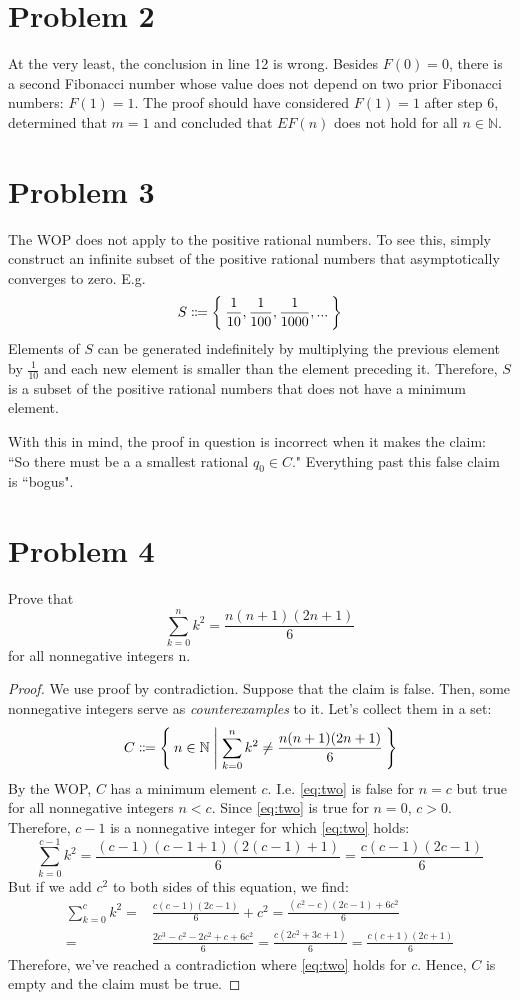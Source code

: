 \documentclass{article}
\begin{document}
\pagebreak

\section{Problem 2} At the very least, the conclusion in line 12 is wrong. Besides $F(0) = 0$, there is a second Fibonacci number whose value does not depend on two prior Fibonacci numbers: $F(1) = 1$. The proof should have considered $F(1) = 1$ after step 6, determined that $m = 1$ and concluded that $EF(n)$ does not hold for all $n \in \mathbb{N}$.

\pagebreak

\section{Problem 3}
The WOP does not apply to the positive rational numbers. To see this, simply construct an infinite subset of the positive rational numbers that asymptotically converges to zero. E.g.
\[
	S \Coloneqq \Set{\frac{1}{10}, \frac{1}{100}, \frac{1}{1000}, ... }
\]
Elements of $S$ can be generated indefinitely by multiplying the previous element by $\frac{1}{10}$ and each new element is smaller than the element preceding it. Therefore, $S$ is a subset of the positive rational numbers that does not have a minimum element.

With this in mind, the proof in question is incorrect when it makes the claim: ``So there must be a a smallest rational $q_0 \in C$." Everything past this false claim is ``bogus".
\pagebreak

\section{Problem 4}
Prove that
\begin{equation}\label{eq:two}
	\sum_{k=0}^n k^2 = \frac{n(n+1)(2n+1)}{6}
\end{equation}
for all nonnegative integers n.
\begin{proof}
	We use proof by contradiction. Suppose that the claim is false. Then, some nonnegative integers serve as \textit{counterexamples} to it. Let's collect them in a set:
	\[
		C \Coloneqq \Set{n \in \mathbb{N} | \sum_{k=0}^n k^2 \neq \frac{n(n+1)(2n+1)}{6}}
	\]
	By the WOP, $C$ has a minimum element $c$. I.e. \eqref{eq:two} is false for $n = c$ but true for all nonnegative integers $n < c$. Since \eqref{eq:two} is true for $n = 0$, $c > 0$.  Therefore, $c - 1$ is a nonnegative integer for which \eqref{eq:two} holds:
	\[
		\sum_{k=0}^{c-1} k^2 = \frac{(c-1)(c-1+1)(2(c-1)+1)}{6} = \frac{c(c-1)(2c-1)}{6}
	\]
	But if we add $c^2$ to both sides of this equation, we find:
	\begin{align*}
		\sum_{k=0}^c k^2 = & \frac{c(c-1)(2c-1)}{6} + c^2 = \frac{(c^2-c)(2c-1)+6c^2}{6} \\ =& \frac{2c^3 - c^2 - 2c^2 + c + 6c^2}{6} = \frac{c(2c^2+3c+1)}{6} = \frac{c(c+1)(2c+1)}{6}
	\end{align*}
	Therefore, we've reached a contradiction where \eqref{eq:two} holds for $c$. Hence, $C$ is empty and the claim must be true.
\end{proof}
\end{document}
